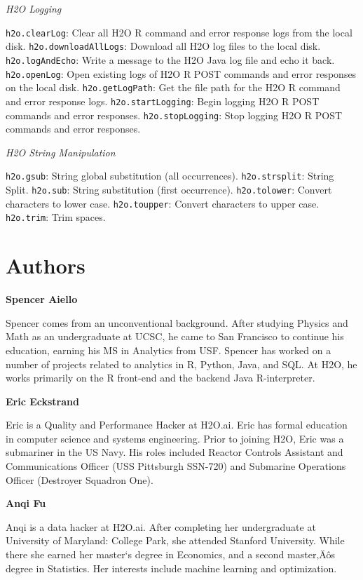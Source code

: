 {{\medskip
\emph{H2O Logging}\par
{\texttt{h2o.clearLog}}: Clear all H2O R command and error response logs from the local disk.  
{\texttt{h2o.downloadAllLogs}}: Download all H2O log files to the local disk. 
{\texttt{h2o.logAndEcho}}: Write a message to the H2O Java log file and echo it back.   
{\texttt{h2o.openLog}}: Open existing logs of H2O R POST commands and error responses on the local disk. 
{\texttt{h2o.getLogPath}}: Get the file path for the H2O R command and error response logs. 
{\texttt{h2o.startLogging}}: Begin logging H2O R POST commands and error responses.  
{\texttt{h2o.stopLogging}}: Stop logging H2O R POST commands and error responses. 

\medskip
\emph{H2O String Manipulation}\par
{\texttt{h2o.gsub}}: String global substitution (all occurrences). 
{\texttt{h2o.strsplit}}: String Split. 
{\texttt{h2o.sub}}: String substitution (first occurrence). 
{\texttt{h2o.tolower}}: Convert characters to lower case. 
{\texttt{h2o.toupper}}: Convert characters to upper case. 
{\texttt{h2o.trim}}: Trim spaces. 
}



\newpage

\newpage

\section{Authors}

\textbf{Spencer Aiello}

Spencer comes from an unconventional background. After studying Physics and Math as an undergraduate at UCSC, he came to San Francisco to continue his education, earning his MS in Analytics from USF.  Spencer has worked on a number of projects related to analytics in R, Python, Java, and SQL. At H2O, he works primarily on the R front-end and the backend Java R-interpreter.

\textbf{Eric Eckstrand}

Eric is a Quality and Performance Hacker at H2O.ai. Eric has formal education in computer science and systems engineering. Prior to joining H2O, Eric was a submariner in the US Navy. His roles included Reactor Controls Assistant and Communications Officer (USS Pittsburgh SSN-720) and Submarine Operations Officer (Destroyer Squadron One). 

\textbf{Anqi Fu}

Anqi is a data hacker at H2O.ai. After completing her undergraduate at University of Maryland: College Park, she attended Stanford University. While there she earned her master`s degree in Economics, and a second master‚Äôs degree in Statistics. Her interests include machine learning and optimization.

}
